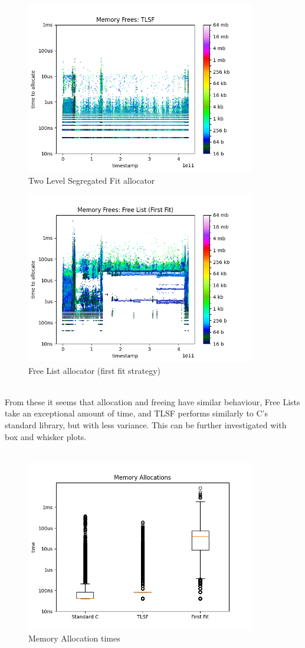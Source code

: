 \documentclass{article}
\begin{document}
\begin{figure}[h]
	\centering
	\includegraphics[width=10cm]{results_tlsf_free}
	\captionsetup{width=10cm}
	\caption{Two Level Segregated Fit allocator}
\end{figure}
\begin{figure}[h]
	\centering
	\includegraphics[width=10cm]{results_first_free}
	\captionsetup{width=10cm}
	\caption{Free List allocator (first fit strategy)}
\end{figure}
\\
From these it seems that allocation and freeing have similar behaviour, Free Lists take an exceptional amount of time, and TLSF performs similarly to C's standard library, but with less variance. This can be further investigated with box and whisker plots.\\
\\
\begin{figure}[h]
	\centering
	\includegraphics[width=10cm]{boxplots_allocate}
	\captionsetup{width=10cm}
	\caption{Memory Allocation times}
\end{figure}
\end{document}
